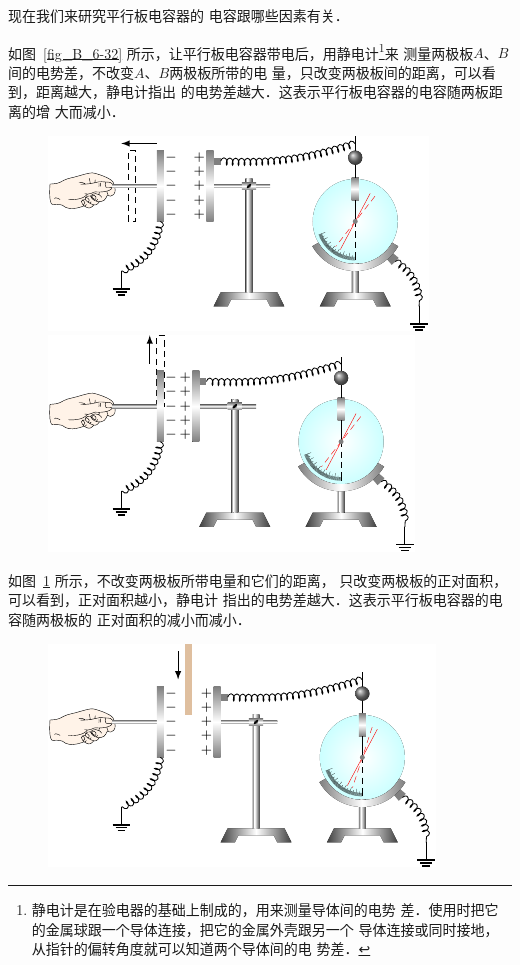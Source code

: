 现在我们来研究平行板电容器的
电容跟哪些因素有关．

如图~\ref{fig_B_6-32} 所示，让平行板电容器带电后，用静电计\footnote{静电计是在验电器的基础上制成的，用来测量导体间的电势
差．使用时把它的金属球跟一个导体连接，把它的金属外壳跟另一个
导体连接或同时接地，从指针的偏转角度就可以知道两个导体间的电
势差．}来
测量两极板$A$、$B$间的电势差，不改变$A$、$B$两极板所带的电
量，只改变两极板间的距离，可以看到，距离越大，静电计指出
的电势差越大．这表示平行板电容器的电容随两板距离的增
大而减小．

\begin{figure}[htbp]
    \centering
    \begin{minipage}[t]{0.48\textwidth}
        \centering
        \includegraphics{fig/B/6-32.pdf}
        \caption{}\label{fig_B_6-32}
    \end{minipage}
    \begin{minipage}[t]{0.48\textwidth}
        \centering
        \includegraphics{fig/B/6-33.pdf}
        \caption{}\label{fig_B_6-33}
    \end{minipage}
\end{figure}

    如图~\ref{fig_B_6-33} 所示，不改变两极板所带电量和它们的距离，
    只改变两极板的正对面积，可以看到，正对面积越小，静电计
    指出的电势差越大．这表示平行板电容器的电容随两极板的
    正对面积的减小而减小．
    \begin{figure}[htbp]
        \centering
        \includegraphics{fig/B/6-34.pdf}
        \caption{}\label{fig_B_6-34}
    \end{figure}

